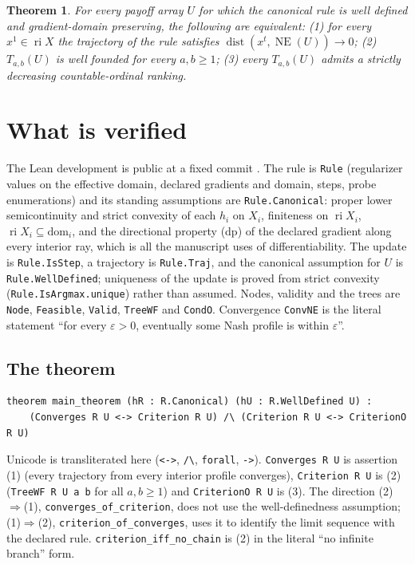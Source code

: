 \documentclass[11pt]{article}
\newtheorem{theorem}{Theorem}
\theoremstyle{definition}
\DeclareMathOperator{\NE}{NE}
\DeclareMathOperator{\dist}{dist}
\DeclareMathOperator{\ri}{ri}
\begin{document}
\begin{theorem}\label{main}
For every payoff array $U$ for which the canonical rule is well defined and gradient-domain preserving, the following are equivalent:
\textup{(1)} for every $x^1\in\ri X$ the trajectory of the rule satisfies $\dist(x^t,\NE(U))\to0$;
\textup{(2)} $T_{a,b}(U)$ is well founded for every $a,b\ge1$;
\textup{(3)} every $T_{a,b}(U)$ admits a strictly decreasing countable-ordinal ranking.
\end{theorem}

\section{What is verified}

The Lean development is public at a fixed commit \cite{Lean}. The rule is \texttt{Rule} (regularizer values on the effective domain, declared gradients and domain, steps, probe enumerations) and its standing assumptions are \texttt{Rule.Canonical}: proper lower semicontinuity and strict convexity of each $h_i$ on $X_i$, finiteness on $\ri X_i$, $\ri X_i\subseteq\mathrm{dom}_i$, and the directional property (dp) of the declared gradient along every interior ray, which is all the manuscript uses of differentiability. The update is \texttt{Rule.IsStep}, a trajectory is \texttt{Rule.Traj}, and the canonical assumption for $U$ is \texttt{Rule.WellDefined}; uniqueness of the update is proved from strict convexity (\texttt{Rule.IsArgmax.unique}) rather than assumed. Nodes, validity and the trees are \texttt{Node}, \texttt{Feasible}, \texttt{Valid}, \texttt{TreeWF} and \texttt{CondO}. Convergence \texttt{ConvNE} is the literal statement ``for every $\varepsilon>0$, eventually some Nash profile is within $\varepsilon$''.

\subsection*{The theorem}
\begin{verbatim}
theorem main_theorem (hR : R.Canonical) (hU : R.WellDefined U) :
    (Converges R U <-> Criterion R U) /\ (Criterion R U <-> CriterionO R U)
\end{verbatim}
Unicode is transliterated here (\texttt{<->}, \texttt{/\textbackslash}, \texttt{forall}, \texttt{->}). \texttt{Converges R U} is assertion (1) (every trajectory from every interior profile converges), \texttt{Criterion R U} is (2) (\texttt{TreeWF R U a b} for all $a,b\ge1$) and \texttt{CriterionO R U} is (3). The direction (2)$\Rightarrow$(1), \texttt{converges\_of\_criterion}, does not use the well-definedness assumption; (1)$\Rightarrow$(2), \texttt{criterion\_of\_converges}, uses it to identify the limit sequence with the declared rule. \texttt{criterion\_iff\_no\_chain} is (2) in the literal ``no infinite branch'' form.
\end{document}
